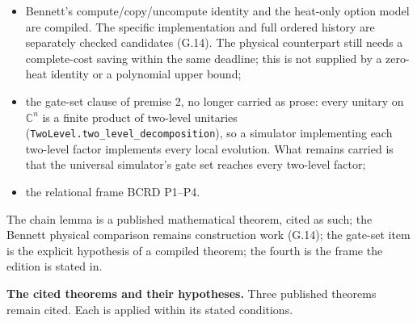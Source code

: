 \documentclass[
]{article}
\begin{document}
\begin{itemize}
  and the fault ceiling is attained on a compiled route. Fault-tolerant
  syndrome-measurement gadgets whose own operations can fail are the
  cited construction of Aliferis, Gottesman and Preskill (2006); their
  faults enter the charged accounts;
\item
  Bennett's
  c\allowbreak{}o\allowbreak{}m\allowbreak{}p\allowbreak{}u\allowbreak{}t\allowbreak{}e\allowbreak{}/\allowbreak{}c\allowbreak{}o\allowbreak{}p\allowbreak{}y\allowbreak{}/\allowbreak{}u\allowbreak{}n\allowbreak{}c\allowbreak{}o\allowbreak{}m\allowbreak{}p\allowbreak{}u\allowbreak{}t\allowbreak{}e
  identity and the heat-only option model are compiled. The specific
  implementation and full ordered history are separately checked
  candidates (G.14). The physical counterpart still needs a
  complete-cost saving within the same deadline; this is not supplied by
  a zero-heat identity or a polynomial upper bound;
\item
  the gate-set clause of premise 2, no longer carried as prose: every
  unitary on \(\mathbb{C}^n\) is a finite product of two-level unitaries
  (\texttt{T\allowbreak{}w\allowbreak{}o\allowbreak{}L\allowbreak{}e\allowbreak{}v\allowbreak{}e\allowbreak{}l\allowbreak{}.\allowbreak{}t\allowbreak{}w\allowbreak{}o\allowbreak{}\_\allowbreak{}l\allowbreak{}e\allowbreak{}v\allowbreak{}e\allowbreak{}l\allowbreak{}\_\allowbreak{}d\allowbreak{}e\allowbreak{}c\allowbreak{}o\allowbreak{}m\allowbreak{}p\allowbreak{}o\allowbreak{}s\allowbreak{}i\allowbreak{}t\allowbreak{}i\allowbreak{}o\allowbreak{}n}),
  so a simulator implementing each two-level factor implements every
  local evolution. What remains carried is that the universal
  simulator's gate set reaches every two-level factor;
\item
  the relational frame BCRD P1--P4.
\end{itemize}

The chain lemma is a published mathematical theorem, cited as such; the
Bennett physical comparison remains construction work (G.14); the
gate-set item is the explicit hypothesis of a compiled theorem; the
fourth is the frame the edition is stated in.

\textbf{The cited theorems and their hypotheses.} Three published
theorems remain cited. Each is applied within its stated conditions.
\end{document}
